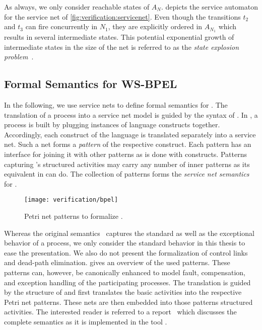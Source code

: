 As always, we only consider reachable states of $A_N$.  depicts the service automaton for the service net of \autoref{fig:verification:servicenet}. Even though the transitions $t_{2}$ and $t_{3}$ can fire concurrently in $N_1$, they are explicitly ordered in $A_{N_1}$ which results in several intermediate states. This potential exponential growth of intermediate states in the size of the net is referred to as the \emph{state explosion problem}~\cite{Valmari_1996_pn}.




\subsection*{Formal Semantics for WS-BPEL}

In the following, we use service nets to define formal semantics for . The translation of a  process into a service net model is guided by the syntax of . In , a process is built by plugging instances of language constructs together. Accordingly, each construct of the language is translated separately into a service net. Such a net forms a \emph{pattern} of the respective  construct. Each pattern has an interface for joining it with other patterns as is done with  constructs. Patterns capturing 's structured activities may carry any number of inner patterns as its equivalent in  can do. The collection of patterns forms the \emph{service net semantics} for .

\begin{figure}
\centering
\texttt{[image: verification/bpel]}
\caption{Petri net patterns to formalize .}\label{fig:bpel}
\end{figure}

Whereas the original semantics~\cite{Lohmann_2007_wsfm,Lohmann_2007_hubtr212} captures the standard as well as the exceptional behavior of a  process, we only consider the standard behavior in this thesis to ease the presentation. We also do not present the formalization of control links and dead-path elimination.  gives an overview of the used patterns. These patterns can, however, be canonically enhanced to model fault, compensation, and exception handling of the participating  processes. The translation is guided by the structure of  and first translates the basic activities into the respective Petri net patterns. These nets are then embedded into those patterns structured activities. The interested reader is referred to a report~\cite{Lohmann_2007_hubtr212} which discusses the complete semantics as it is implemented in the tool \bpelowfn.

